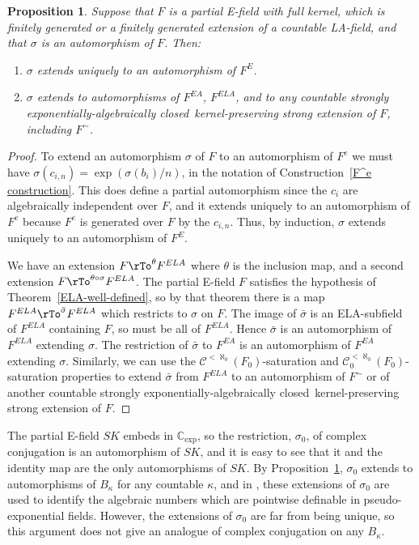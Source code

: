 \documentclass[12pt]{amsart}
\newtheorem{prop}{Proposition}[section]
\theoremstyle{definition}
\begin{document}
\begin{prop}\label{extending autos} Suppose that $F$ is a partial E-field with full kernel, which is finitely generated or a finitely generated extension of a countable LA-field, and that $\sigma$ is an automorphism of $F$. Then:
 \begin{enumerate}
  \item $\sigma$ extends uniquely to an automorphism of $F^E$.
  \item $\sigma$ extends to automorphisms of $F^{EA}$, $F^{ELA}$, and to any countable {strongly exponentially-algebraically closed}\ kernel-preserving strong extension of $F$, including ${\ensuremath{{{F}}^\sim}}$.
 \end{enumerate}
\end{prop}
\begin{proof}
To extend an automorphism $\sigma$ of $F$ to an automorphism of $F^e$ we must have $\sigma(c_{i,n}) = \exp(\sigma(b_i)/n)$, in the notation of Construction~\ref{F^e construction}. This does define a partial automorphism since the $c_i$ are algebraically independent over $F$, and it extends uniquely to an automorphism of $F^e$ because $F^e$ is generated over $F$ by the $c_{i,n}$. Thus, by induction, $\sigma$ extends uniquely to an automorphism of $F^E$.

We have an extension $F \rTo^{\theta} F^{ELA}$ where $\theta$ is the inclusion map, and a second extension $F \rTo^{\theta \circ \sigma} F^{ELA}$. The partial E-field $F$ satisfies the hypothesis of Theorem~\ref{ELA-well-defined}, so by that theorem there is a map $F^{ELA} \rTo^{\bar{\sigma}} F^{ELA}$ which restricts to $\sigma$ on $F$. The image of $\bar{\sigma}$ is an ELA-subfield of $F^{ELA}$ containing $F$, so must be all of $F^{ELA}$. Hence $\bar{\sigma}$ is an automorphism of $F^{ELA}$ extending $\sigma$. The restriction of $\bar{\sigma}$ to $F^{EA}$ is an automorphism of $F^{EA}$ extending $\sigma$. Similarly, we can use the ${\ensuremath{\mathcal{C}}}^{<\aleph_0}(F_0)$-saturation and ${\ensuremath{\mathcal{C}}}_0^{<\aleph_0}(F_0)$-saturation properties to extend $\bar{\sigma}$ from $F^{ELA}$ to an automorphism of ${\ensuremath{{{F}}^\sim}}$ or of another countable {strongly exponentially-algebraically closed}\ kernel-preserving strong extension of $F$.
\end{proof}

The partial E-field $SK$ embeds in ${\ensuremath{\mathbb{C}_{\mathrm{exp}}}}$, so the restriction, $\sigma_0$, of complex conjugation is an automorphism of $SK$, and it is easy to see that it and the identity map are the only automorphisms of $SK$. By Proposition~\ref{extending autos}, $\sigma_0$ extends to automorphisms of $B_\kappa$ for any countable $\kappa$, and in \cite{KMO10}, these extensions of $\sigma_0$ are used to identify the algebraic numbers which are pointwise definable in pseudo-exponential fields. However, the extensions of $\sigma_0$ are far from being unique, so this argument does not give an analogue of complex conjugation on any $B_\kappa$.
\end{document}
